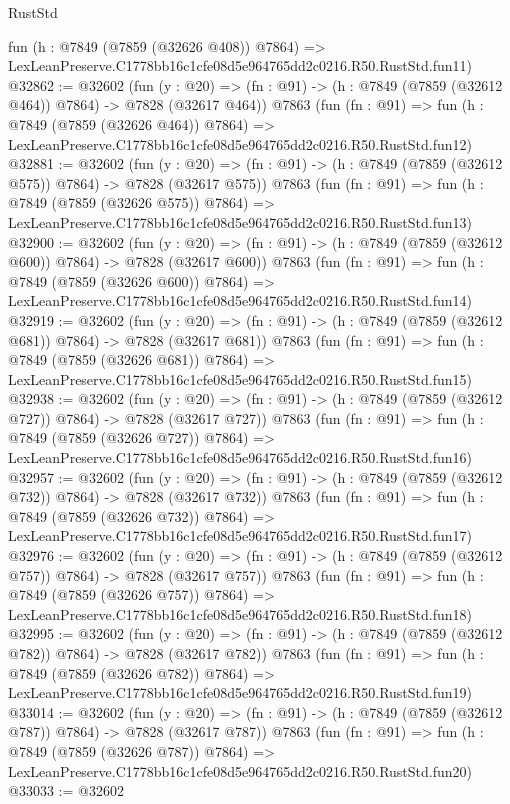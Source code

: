 \begin{lexlean}{RustStd}
\begin{coremodule}
    fun (h : @7849 (@7859 (@32626 @408)) @7864) =>
    LexLeanPreserve.C1778bb16c1cfe08d5e964765dd2c0216.R50.RustStd.fun11)
@32862 := @32602
    (fun (y : @20) => (fn : @91) -> (h : @7849 (@7859 (@32612 @464)) @7864) -> @7828 (@32617 @464))
    @7863
    (fun (fn : @91) =>
    fun (h : @7849 (@7859 (@32626 @464)) @7864) =>
    LexLeanPreserve.C1778bb16c1cfe08d5e964765dd2c0216.R50.RustStd.fun12)
@32881 := @32602
    (fun (y : @20) => (fn : @91) -> (h : @7849 (@7859 (@32612 @575)) @7864) -> @7828 (@32617 @575))
    @7863
    (fun (fn : @91) =>
    fun (h : @7849 (@7859 (@32626 @575)) @7864) =>
    LexLeanPreserve.C1778bb16c1cfe08d5e964765dd2c0216.R50.RustStd.fun13)
@32900 := @32602
    (fun (y : @20) => (fn : @91) -> (h : @7849 (@7859 (@32612 @600)) @7864) -> @7828 (@32617 @600))
    @7863
    (fun (fn : @91) =>
    fun (h : @7849 (@7859 (@32626 @600)) @7864) =>
    LexLeanPreserve.C1778bb16c1cfe08d5e964765dd2c0216.R50.RustStd.fun14)
@32919 := @32602
    (fun (y : @20) => (fn : @91) -> (h : @7849 (@7859 (@32612 @681)) @7864) -> @7828 (@32617 @681))
    @7863
    (fun (fn : @91) =>
    fun (h : @7849 (@7859 (@32626 @681)) @7864) =>
    LexLeanPreserve.C1778bb16c1cfe08d5e964765dd2c0216.R50.RustStd.fun15)
@32938 := @32602
    (fun (y : @20) => (fn : @91) -> (h : @7849 (@7859 (@32612 @727)) @7864) -> @7828 (@32617 @727))
    @7863
    (fun (fn : @91) =>
    fun (h : @7849 (@7859 (@32626 @727)) @7864) =>
    LexLeanPreserve.C1778bb16c1cfe08d5e964765dd2c0216.R50.RustStd.fun16)
@32957 := @32602
    (fun (y : @20) => (fn : @91) -> (h : @7849 (@7859 (@32612 @732)) @7864) -> @7828 (@32617 @732))
    @7863
    (fun (fn : @91) =>
    fun (h : @7849 (@7859 (@32626 @732)) @7864) =>
    LexLeanPreserve.C1778bb16c1cfe08d5e964765dd2c0216.R50.RustStd.fun17)
@32976 := @32602
    (fun (y : @20) => (fn : @91) -> (h : @7849 (@7859 (@32612 @757)) @7864) -> @7828 (@32617 @757))
    @7863
    (fun (fn : @91) =>
    fun (h : @7849 (@7859 (@32626 @757)) @7864) =>
    LexLeanPreserve.C1778bb16c1cfe08d5e964765dd2c0216.R50.RustStd.fun18)
@32995 := @32602
    (fun (y : @20) => (fn : @91) -> (h : @7849 (@7859 (@32612 @782)) @7864) -> @7828 (@32617 @782))
    @7863
    (fun (fn : @91) =>
    fun (h : @7849 (@7859 (@32626 @782)) @7864) =>
    LexLeanPreserve.C1778bb16c1cfe08d5e964765dd2c0216.R50.RustStd.fun19)
@33014 := @32602
    (fun (y : @20) => (fn : @91) -> (h : @7849 (@7859 (@32612 @787)) @7864) -> @7828 (@32617 @787))
    @7863
    (fun (fn : @91) =>
    fun (h : @7849 (@7859 (@32626 @787)) @7864) =>
    LexLeanPreserve.C1778bb16c1cfe08d5e964765dd2c0216.R50.RustStd.fun20)
@33033 := @32602

\end{coremodule}
\end{lexlean}
